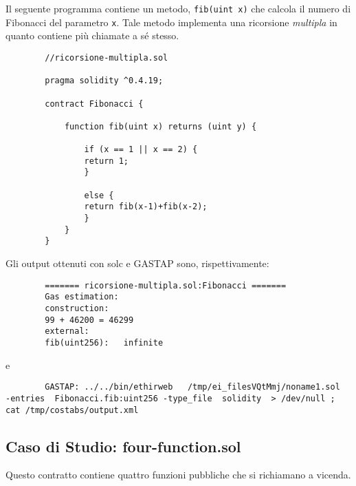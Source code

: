         Il seguente programma contiene un metodo, \verb|fib(uint x)| che calcola il numero di Fibonacci del parametro \verb|x|. Tale metodo implementa una ricorsione \emph{multipla} in quanto contiene più chiamate a sé stesso.\newline
        
        \begin{minipage}{\linewidth}
        \begin{lstlisting}
        //ricorsione-multipla.sol

        pragma solidity ^0.4.19;

        contract Fibonacci {

            function fib(uint x) returns (uint y) {
            
                if (x == 1 || x == 2) {
                return 1;
                }
                
                else {
                return fib(x-1)+fib(x-2);
                }
            }
        }
        \end{lstlisting}
        \end{minipage}
        
        Gli output ottenuti con solc e GASTAP sono, rispettivamente:
        
        \begin{minipage}{\linewidth}
        \begin{lstlisting}
        ======= ricorsione-multipla.sol:Fibonacci =======
        Gas estimation:
        construction:
        99 + 46200 = 46299
        external:
        fib(uint256):	infinite
        \end{lstlisting}
        \end{minipage}

        e
    
        \begin{lstlisting}
        GASTAP: ../../bin/ethirweb   /tmp/ei_filesVQtMmj/noname1.sol  -entries  Fibonacci.fib:uint256 -type_file  solidity  > /dev/null ; cat /tmp/costabs/output.xml         
        \end{lstlisting}
        
     
    \newpage
     
    \subsection{Caso di Studio: four-function.sol}
    
    Questo contratto contiene quattro funzioni pubbliche che si richiamano a vicenda. 
    
